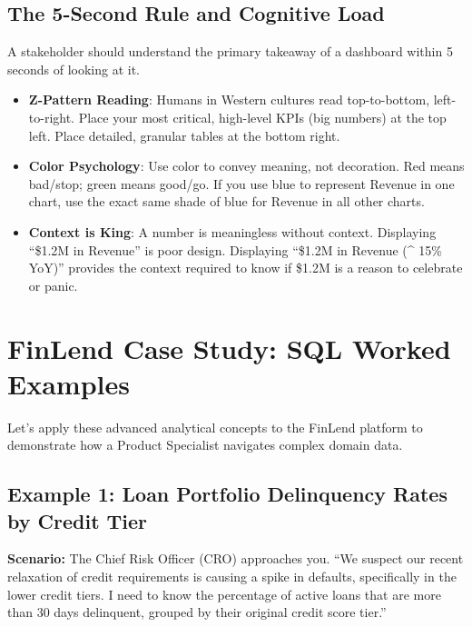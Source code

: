 \subsection{The 5-Second Rule and Cognitive
Load}\label{the-5-second-rule-and-cognitive-load}

A stakeholder should understand the primary takeaway of a dashboard
within 5 seconds of looking at it.

\begin{itemize}
\tightlist
\item
  \textbf{Z-Pattern Reading}: Humans in Western cultures read
  top-to-bottom, left-to-right. Place your most critical, high-level
  KPIs (big numbers) at the top left. Place detailed, granular tables at
  the bottom right.
\item
  \textbf{Color Psychology}: Use color to convey meaning, not
  decoration. Red means bad/stop; green means good/go. If you use blue
  to represent Revenue in one chart, use the exact same shade of blue
  for Revenue in all other charts.
\item
  \textbf{Context is King}: A number is meaningless without context.
  Displaying ``\$1.2M in Revenue'' is poor design. Displaying ``\$1.2M
  in Revenue (\^{} 15\% YoY)'' provides the context required to know if
  \$1.2M is a reason to celebrate or panic.
\end{itemize}

\bigskip

\section{FinLend Case Study: SQL Worked
Examples}\label{finlend-case-study-sql-worked-examples}

Let's apply these advanced analytical concepts to the FinLend platform
to demonstrate how a Product Specialist navigates complex domain data.

\subsection{Example 1: Loan Portfolio Delinquency Rates by Credit
Tier}\label{example-1-loan-portfolio-delinquency-rates-by-credit-tier}

\textbf{Scenario:} The Chief Risk Officer (CRO) approaches you. ``We
suspect our recent relaxation of credit requirements is causing a spike
in defaults, specifically in the lower credit tiers. I need to know the
percentage of active loans that are more than 30 days delinquent,
grouped by their original credit score tier.''

